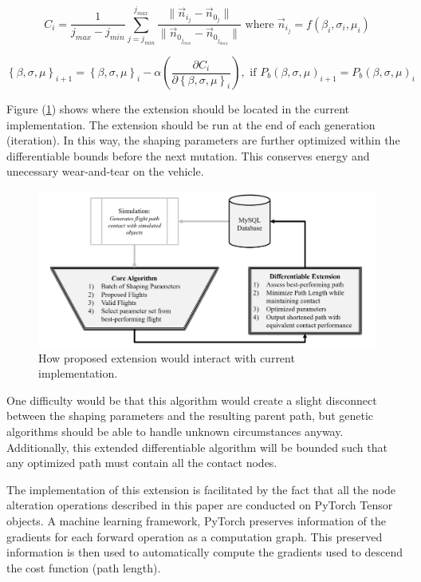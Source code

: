 \documentclass[conf]{new-aiaa}
\begin{document}
\begin{equation}
\label{path_deviation_eqn}
C_i = \frac{1}{j_{max} - j_{min}}\sum\limits_{j=j_{min}}^{j_{max}}\frac{\|\vec{n}_{i_j} - \vec{n}_{0_j}\|}{\|\vec{n}_{0_{j_{min}}} - \vec{n}_{0_{j_{max}}}\|} \text{ where } \vec{n}_{i_j} = f\left(\beta_i, \sigma_i, \mu_i\right)
\end{equation}

\begin{equation}
\label{gradient-descent}
\left\{\beta, \sigma, \mu\right\}_{i + 1} = \left\{\beta, \sigma, \mu\right\}_i - \alpha\left(\frac{\partial{C_i}}{\partial{\left\{\beta, \sigma, \mu\right\}_i}}\right), \text{ if } P_b\left(\beta, \sigma, \mu\right)_{i + 1} = P_b\left(\beta, \sigma, \mu\right)_{i}
\end{equation}

Figure (\ref{future-extension}) shows where the extension should be located in the current implementation. The extension should be run at the end of each generation (iteration). In this way, the shaping parameters are further optimized within the differentiable bounds before the next mutation. This conserves energy and unecessary wear-and-tear on the vehicle.

\begin{figure}[hbt!]
\centering
\includegraphics[width=1\textwidth]{figs/future-extension}
\caption{How proposed extension would interact with current implementation.}
\label{future-extension}
\end{figure}

One difficulty would be that this algorithm would create a slight disconnect between the shaping parameters and the resulting parent path, but genetic algorithms should be able to handle unknown circumstances anyway. Additionally, this extended differentiable algorithm will be bounded such that any optimized path must contain all the contact nodes.

The implementation of this extension is facilitated by the fact that all the node alteration operations described in this paper are conducted on PyTorch Tensor objects. A machine learning framework, PyTorch preserves information of the gradients for each forward operation as a computation graph. This preserved information is then used to automatically compute the gradients used to descend the cost function (path length).
\end{document}
